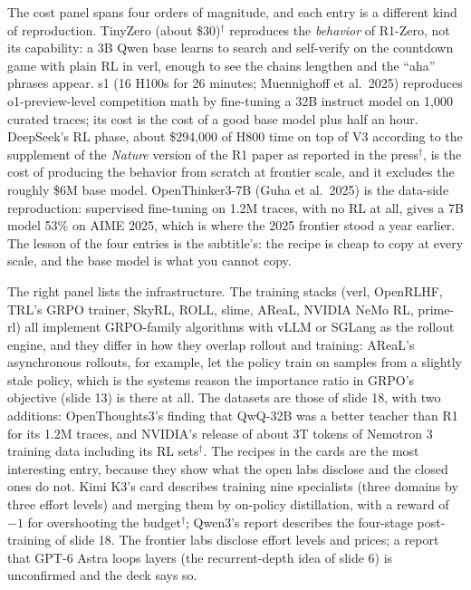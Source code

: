 \documentclass[11pt,letterpaper]{article}
\newcommand{\paper}[1]{\textit{#1}}
\begin{document}
The cost panel spans four orders of magnitude, and each entry is a different kind of reproduction. TinyZero (about \$30)$^\dagger$ reproduces the \emph{behavior} of R1-Zero, not its capability: a 3B Qwen base learns to search and self-verify on the countdown game with plain RL in verl, enough to see the chains lengthen and the ``aha'' phrases appear. s1 (16 H100s for 26 minutes; Muennighoff et al.\ 2025) reproduces o1-preview-level competition math by fine-tuning a 32B instruct model on 1,000 curated traces; its cost is the cost of a good base model plus half an hour. DeepSeek's RL phase, about \$294,000 of H800 time on top of V3 according to the supplement of the \paper{Nature} version of the R1 paper as reported in the press$^\dagger$, is the cost of producing the behavior from scratch at frontier scale, and it excludes the roughly \$6M base model. OpenThinker3-7B (Guha et al.\ 2025) is the data-side reproduction: supervised fine-tuning on 1.2M traces, with no RL at all, gives a 7B model 53\% on AIME 2025, which is where the 2025 frontier stood a year earlier. The lesson of the four entries is the subtitle's: the recipe is cheap to copy at every scale, and the base model is what you cannot copy.

The right panel lists the infrastructure. The training stacks (verl, OpenRLHF, TRL's GRPO trainer, SkyRL, ROLL, slime, AReaL, NVIDIA NeMo RL, prime-rl) all implement GRPO-family algorithms with vLLM or SGLang as the rollout engine, and they differ in how they overlap rollout and training: AReaL's asynchronous rollouts, for example, let the policy train on samples from a slightly stale policy, which is the systems reason the importance ratio in GRPO's objective (slide 13) is there at all. The datasets are those of slide 18, with two additions: OpenThoughts3's finding that QwQ-32B was a better teacher than R1 for its 1.2M traces, and NVIDIA's release of about 3T tokens of Nemotron 3 training data including its RL sets$^\dagger$. The recipes in the cards are the most interesting entry, because they show what the open labs disclose and the closed ones do not. Kimi K3's card describes training nine specialists (three domains by three effort levels) and merging them by on-policy distillation, with a reward of $-1$ for overshooting the budget$^\dagger$; Qwen3's report describes the four-stage post-training of slide 18. The frontier labs disclose effort levels and prices; a report that GPT-6 Astra loops layers (the recurrent-depth idea of slide 6) is unconfirmed and the deck says so.
\end{document}
